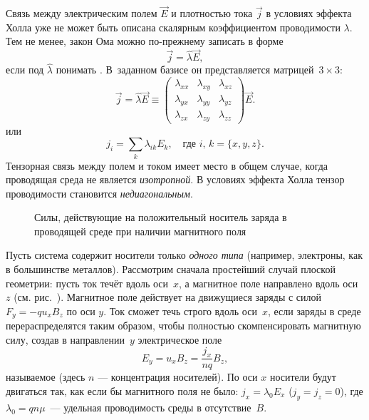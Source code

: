 
Связь между электрическим полем $\vec{E}$ и плотностью тока $\vec{j}$ в
условиях эффекта Холла уже не может быть описана скалярным коэффициентом проводимости
$\lambda$. Тем не менее, закон Ома можно по-прежнему записать
в форме
\begin{equation}
\vec{j} = \hat{\lambda} \vec{E},
\end{equation}
если под $\hat{\lambda}$
понимать . В~заданном базисе он представляется
матрицей~$3\times 3$:
\begin{equation}
    \vec{j} =\hat{\lambda}\vec{E}\equiv \left(
    \begin{matrix}
     \lambda_{xx} & \lambda_{xy} & \lambda_{xz}\\
     \lambda_{yx} & \lambda_{yy} & \lambda_{yz}\\
     \lambda_{zx} & \lambda_{zy} & \lambda_{zz}
    \end{matrix}
\right) \vec{E}.
\end{equation}
или
\begin{equation*}
    j_{i} = \sum_{k} \lambda_{ik} E_k,\quad \text{где~}i,\,k=\{x,y,z\}.
\end{equation*}
Тензорная связь между полем и током имеет место в общем случае, когда
проводящая среда не является \emph{изотропной}.
В условиях эффекта Холла тензор проводимости становится \emph{недиагональным}.


\begin{figure}[h!]
\centering
    \caption{Силы, действующие на положительный носитель заряда в проводящей среде
    при наличии магнитного поля}
\end{figure}

Пусть система содержит носители только \emph{одного типа}
(например, электроны, как в большинстве металлов).
Рассмотрим сначала простейший случай плоской геометрии:
пусть ток течёт вдоль оси~$x$, 
а магнитное поле направлено вдоль оси $z$ (см. рис.~).
Магнитное поле действует на движущиеся заряды с силой $F_y=-qu_xB_z$ по оси $y$.
Ток сможет течь строго вдоль оси~$x$, если заряды в среде перераспределятся 
таким образом, чтобы полностью скомпенсировать магнитную силу, 
создав в направлении~$y$ электрическое поле
\begin{equation*}
E_y=u_x B_z=\frac{j_x}{nq} B_z,
\end{equation*}
называемое  (здесь $n$ --- концентрация носителей).
По оси $x$ носители будут двигаться так, как если бы магнитного поля не было:
$j_x=\lambda_0 E_x$ ($j_y=j_z=0$), где $\lambda_0 = qn\mu$~---
удельная проводимость среды в отсутствие~$B$.

